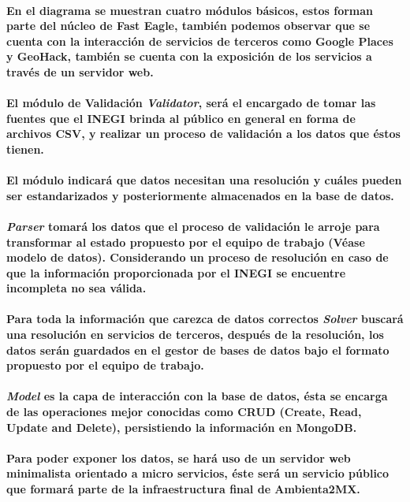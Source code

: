     \paragraph{En el diagrama se muestran cuatro módulos básicos, estos forman parte del núcleo de Fast Eagle, también podemos observar que se cuenta con la interacción de servicios de terceros como Google Places y GeoHack, también se cuenta con la exposición de los servicios a través de un servidor  web.}
    \paragraph{El módulo de Validación \textbf{\emph{Validator}}, será el encargado de tomar las fuentes que el INEGI brinda al público en general en forma de archivos CSV, y realizar un proceso de validación a los datos que éstos tienen.}
    \paragraph{El módulo indicará que datos necesitan una resolución y cuáles pueden ser estandarizados y posteriormente almacenados en la base de datos.}
    \paragraph{\textbf{\emph{Parser}} tomará los datos que el proceso de validación le arroje para transformar al estado propuesto por el equipo de trabajo (Véase modelo de datos). Considerando un proceso de resolución en caso de que la información proporcionada por el INEGI se encuentre incompleta no sea válida.}
    \paragraph{Para toda la información que carezca de datos correctos \textbf{\emph{Solver}} buscará una resolución en servicios de terceros, después de la resolución, los datos serán guardados en el gestor de bases de datos bajo el formato propuesto por el equipo de trabajo.}
    \paragraph{\textbf{\emph{Model}} es la capa de interacción con la base de datos, ésta se encarga de las operaciones mejor conocidas como CRUD (Create, Read, Update and Delete),  persistiendo la información en MongoDB.}
    \paragraph{Para poder exponer los datos, se hará uso de un servidor web minimalista orientado a micro servicios, éste será un servicio público que formará parte de la infraestructura final de Ambienta2MX.}
